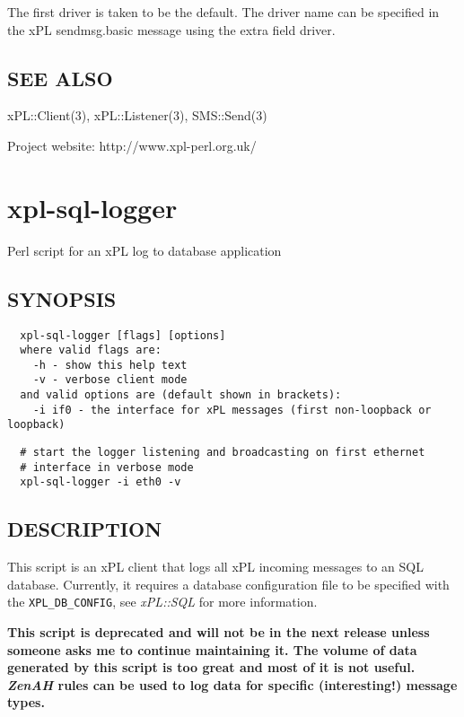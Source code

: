 The first driver is taken to be the default.  The driver name can be
specified in the xPL sendmsg.basic message using the extra field
driver.

\subsection*{SEE ALSO\label{xpl-sms-send_SEE_ALSO}}


xPL::Client(3), xPL::Listener(3), SMS::Send(3)



Project website: http://www.xpl-perl.org.uk/

\section{xpl-sql-logger\label{xpl-sql-logger}}


Perl script for an xPL log to database application

\subsection*{SYNOPSIS\label{xpl-sql-logger_SYNOPSIS}}
\begin{verbatim}
  xpl-sql-logger [flags] [options]
  where valid flags are:
    -h - show this help text
    -v - verbose client mode
  and valid options are (default shown in brackets):
    -i if0 - the interface for xPL messages (first non-loopback or loopback)
\end{verbatim}
\begin{verbatim}
  # start the logger listening and broadcasting on first ethernet
  # interface in verbose mode
  xpl-sql-logger -i eth0 -v
\end{verbatim}
\subsection*{DESCRIPTION\label{xpl-sql-logger_DESCRIPTION}}


This script is an xPL client that logs all xPL incoming messages to an
SQL database.  Currently, it requires a database configuration file to
be specified with the \texttt{XPL\_DB\_CONFIG}, see \emph{xPL::SQL} for more
information.



\textbf{This script is deprecated and will not be in the next release unless
someone asks me to continue maintaining it.  The volume of data
generated by this script is too great and most of it is not useful.
\emph{ZenAH} rules can be used to log data for specific (interesting!)
message types.}

